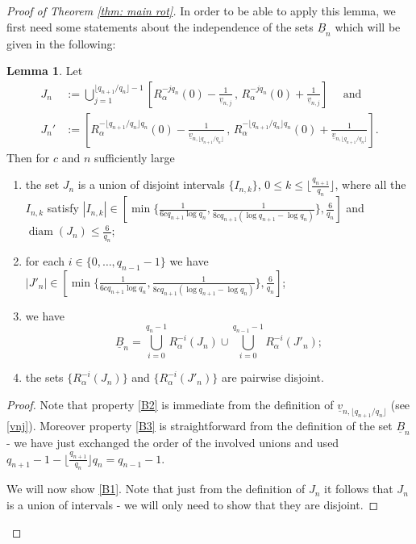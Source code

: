 \documentclass[11pt]{amsart}
\theoremstyle{definition}
\newtheorem{lemma}[definition]{Lemma}
\numberwithin{equation}{section}
\DeclareMathOperator{\diam}{diam}
\begin{document}
\begin{proof}[Proof of Theorem \ref{thm: main rot}]
In order to be able to apply this lemma, we first need some statements about the independence of the sets $\underline{B}_n$ which will be given in the following:





\begin{lemma}\label{lem:add} 
Let 
\begin{align*}
 J_n&:= \bigcup_{j=1}^{\lfloor q_{n+1}/q_n\rfloor-1} \left[ R_{\alpha}^{-jq_n}(0)-\frac{1}{\underline{v}_{n,j}}\, ,\, R_{\alpha}^{-jq_n}(0) + \frac{1}{\underline{v}_{n,j}}\right]\quad\text{ and }\\
 J_n'&:=\left[ R_{\alpha}^{-\lfloor q_{n+1}/q_n\rfloor q_n}(0)-\frac{1}{\underline{v}_{n,\lfloor q_{n+1}/q_n\rfloor}}\, ,\, R_{\alpha}^{-\lfloor q_{n+1}/q_n\rfloor q_n}(0) + \frac{1}{\underline{v}_{n,\lfloor q_{n+1}/q_n\rfloor}}\right].
\end{align*}
Then for $c$ and $n$ sufficiently large
\begin{enumerate}[label=\textbf{(B.\arabic*)}]
\item\label{B1} the set $J_{n}$ is a union of disjoint intervals $\{I_{n,k}\}$, $0 \leq k\leq \lfloor \frac{q_{n+1}}{q_n}\rfloor$, where all the $I_{n,k}$
satisfy $|I_{n,k}|\in [\min\{ \frac{1}{6cq_{n+1}\log q_n}, \frac{1}{8c q_{n+1}(\log q_{n+1}-\log q_n)}\}, \frac{6}{q_n}]$ and $\diam(J_{n})\leq \frac{6}{q_n}$;
\item\label{B2} for each $i\in \{0,\ldots, q_{n-1}-1\}$ we have $|J'_{n}|\in  [\min\{ \frac{1}{6cq_{n+1}\log q_n}, \frac{1}{8c q_{n+1}(\log q_{n+1}-\log q_n)}\}, \frac{6}{q_n}]$; 
\item\label{B3} 
we have  $$\underline{B}_n=\bigcup_{i=0}^{q_n-1} R^{-i}_\alpha(J_n)\cup \bigcup_{i=0}^{q_{n-1}-1} R^{-i}_\alpha(J'_n);$$

\item\label{B4} the sets $\{R^{-i}_\alpha(J_n)\}$ and $\{R^{-i}_\alpha(J'_n)\}$ are pairwise disjoint.
\end{enumerate}
\end{lemma}
\begin{proof} Note that property \ref{B2} is immediate from the definition of $\underline{v}_{n,\lfloor q_{n+1}/q_n\rfloor}$ (see 
\eqref{vnj}). 
Moreover property \ref{B3} is straightforward from the definition of the set $\underline{B}_n$ - we have just exchanged the order of the involved unions and used $q_{n+1}-1-\lfloor \frac{q_{n+1}}{q_n}\rfloor q_n= q_{n-1}-1$.


 We will now show \ref{B1}. Note that just from the definition of $J_n$ it follows that $J_n$ is a union of intervals - we will only need to show that they are disjoint.
 

\end{proof}
\end{proof}
\end{document}
